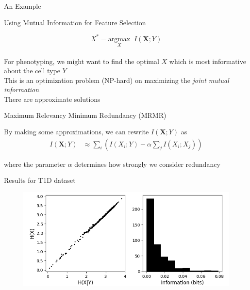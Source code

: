 \documentclass{beamer}					%
\begin{document}
\begin{frame}{An Example}

\end{frame}

\begin{frame}{Using Mutual Information for Feature Selection}

\begin{equation*}
X^{*} = \underset{X}{\mathrm{argmax}}\;\; I(\bm{X};Y)
\end{equation*}\\
\vspace{0.2in}
For phenotyping, we might want to find the optimal $X$ which is most informative about the cell type $Y$\\
\vspace{0.2in}
This is an optimization problem (NP-hard) on maximizing the \emph{joint mutual information}\\
\vspace{0.2in}
There are approximate solutions

\end{frame}

\begin{frame}{Maximum Relevancy Minimum Redundancy (MRMR)}

By making some approximations, we can rewrite $I(\bm{X};Y)$ as
\begin{align*}
I(\bm{X};Y) &\approx \sum_{i} \left(I(X_{i};Y)- \alpha\sum_{j}I(X_{i};X_{j}) \right)
\end{align*}

where the parameter $\alpha$ determines how strongly we consider redundancy

\end{frame}

\begin{frame}{Results for T1D dataset}

\begin{center}
\begin{figure}
\includegraphics[width=1.0\textwidth]{info.png}
\end{figure}
\end{center}
\end{frame}
\end{document}
